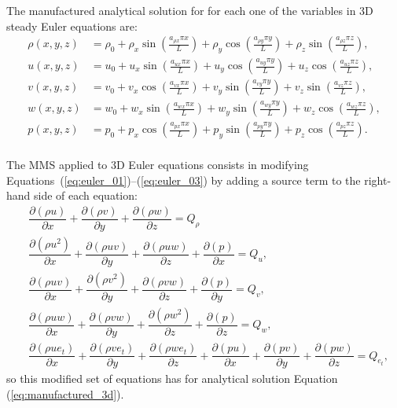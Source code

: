 \documentclass[10pt]{article}
\newcommand{\Diff}[2] {\dfrac{\partial( #1)}{\partial #2}}
\begin{document}
The manufactured analytical solution for for each one of the variables in 3D steady Euler equations are:
\begin{equation}
\begin{split}
\label{eq:manufactured_3d}
\rho\left( x ,y ,z\right) &=  \rho_{0}+ \rho_{x} \sin\left(\frac{a_{ \rho  x} \pi x}{L}\right)+ \rho_{y} \cos\left(\frac{a_{ \rho  y} \pi y}{L}\right) + \rho_{z} \sin\left(\frac{a_{ \rho  z} \pi z}{L}\right) ,\\
u\left( x ,y ,z\right) &= u_{0}+u_{x} \sin\left(\frac{a_{u  x} \pi x}{L}\right)+u_{y} \cos\left(\frac{a_{u  y} \pi y}{L}\right)+u_{z} \cos\left(\frac{a_{u  z} \pi z}{L}\right) ,\\
v\left( x ,y ,z\right) &= v_{0}+v_{x} \cos\left(\frac{a_{v  x} \pi x}{L}\right)+v_{y} \sin\left(\frac{a_{v  y} \pi y}{L}\right)+v_{z} \sin\left(\frac{a_{v  z} \pi z}{L}\right), \\
w\left( x ,y ,z\right) &= w_{0}+w_{x} \sin\left(\frac{a_{w  x} \pi x}{L}\right)+w_{y} \sin\left(\frac{a_{w  y} \pi y}{L}\right)+ w_{z} \cos\left(\frac{a_{w  z} \pi z}{L}\right) ,\\
p\left( x ,y ,z\right) &= p_{0}+p_{x} \cos\left(\frac{a_{p  x} \pi x}{L}\right)+p_{y} \sin\left(\frac{a_{p  y} \pi y}{L}\right)+ p_{z} \cos\left(\frac{a_{p  z} \pi z}{L}\right).\\
\end{split}
\end{equation}


The MMS applied to 3D Euler equations consists in modifying Equations~(\ref{eq:euler_01})--(\ref{eq:euler_03}) by adding a source term to the right-hand side of each equation:
\begin{equation}
\begin{split}
\label{eq:euler_3d_mod}
&\Diff{\rho u}{x}+\Diff{\rho v}{y} + \Diff{\rho w}{z} = Q_\rho\\
%
 &\Diff{\rho u^2 }{x}+\Diff{\rho uv}{y} +\Diff{\rho uw}{z} +\Diff{p}{x}= Q_u,\\
%
&\Diff{\rho uv }{x}+\Diff{\rho v^2}{y} +\Diff{\rho vw}{z}+\Diff{p}{y}= Q_v,\\
%
&\Diff{\rho uw }{ x}+\Diff{\rho  vw }{ y}+\Diff{\rho w^2 }{ z}+\Diff{p}{z}=Q_w,\\
%
&\Diff{\rho u e_t}{x}+\Diff{\rho v e_t}{y}+\Diff{\rho w e_t}{z}+\Diff{pu}{x}+\Diff{pv}{y}+\Diff{pw}{z} =Q_{e_t},
\end{split}
\end{equation}
so this modified set of equations has for analytical solution Equation (\ref{eq:manufactured_3d}).
\end{document}
